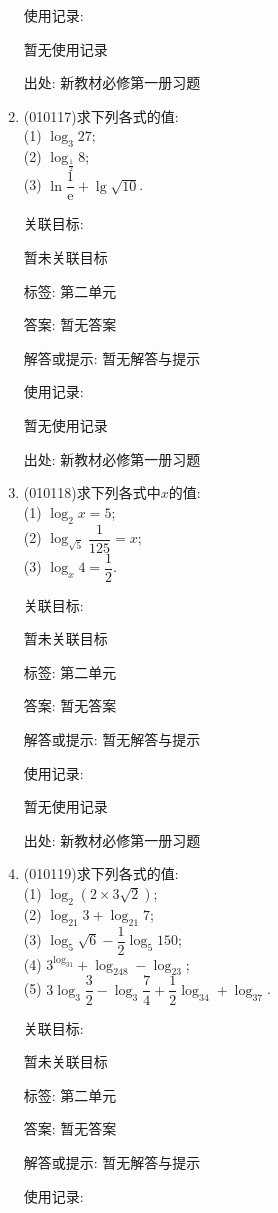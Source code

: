 \documentclass[10pt,a4paper]{article}
\begin{document}
\begin{enumerate}[1.]
使用记录:

暂无使用记录


出处: 新教材必修第一册习题
\item { (010117)}求下列各式的值:\\
(1) $\log_3 27$;\\
(2) $\log_{\frac 12}8$;\\
(3) $\ln \dfrac 1{\mathrm{e}}+\lg \sqrt {10}$.


关联目标:

暂未关联目标



标签: 第二单元

答案: 暂无答案

解答或提示: 暂无解答与提示

使用记录:

暂无使用记录


出处: 新教材必修第一册习题
\item { (010118)}求下列各式中$x$的值:\\
(1) $\log_2x=5$;\\
(2) $\log_{\sqrt 5}\dfrac1{125}=x$;\\
(3) $\log_x4=\dfrac 12$.


关联目标:

暂未关联目标



标签: 第二单元

答案: 暂无答案

解答或提示: 暂无解答与提示

使用记录:

暂无使用记录


出处: 新教材必修第一册习题
\item { (010119)}求下列各式的值:\\
(1) $\log_2(2\times 3\sqrt 2)$;\\
(2) $\log_{21}3+\log_{21}7$;\\
(3) $\log_5\sqrt 6-\dfrac 12\log_5 150$;\\
(4) $3^{\log_31}+\log_248-\log_23$;\\
(5) $3\log_3\dfrac 32-\log_3\dfrac 74+\dfrac 12\log_34+\log_37$.


关联目标:

暂未关联目标



标签: 第二单元

答案: 暂无答案

解答或提示: 暂无解答与提示

使用记录:


\end{enumerate}
\end{document}
